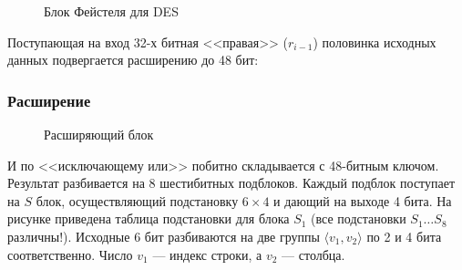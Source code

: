 \begin{frame}
\begin{figure}
\begin{center}
        \end{center}
        \caption{Блок Фейстеля для DES}\label{pict:des}
    \end{figure}
\end{frame}

Поступающая на вход 32-х битная <<правая>> ($r_{i-1}$) половинка исходных данных подвергается расширению до 48 бит:

\begin{frame}
    \frametitle{Расширение}

    \begin{figure}
        \begin{center}
        \end{center}
        \caption{Расширяющий блок}\label{pict:desR}
    \end{figure}
\end{frame}

И по <<исключающему или>> побитно складывается с 48-битным ключом. Результат разбивается на 8 шестибитных подблоков. Каждый подблок поступает на $S$ блок, осуществляющий подстановку $6\times 4$ и дающий на выходе 4 бита. На рисунке приведена таблица подстановки для блока $S_1$ (все подстановки $S_1\ldots S_8$ различны!). Исходные 6 бит разбиваются на две группы $\langle v_1, v_2\rangle$ по 2 и 4 бита соответственно. Число $v_1$ --- индекс строки, а $v_2$ --- столбца.

